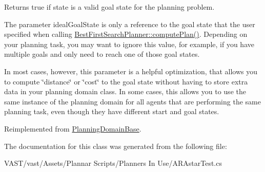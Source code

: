 Returns true if state is a valid goal state for the planning problem. 

The parameter ideal\-Goal\-State is only a reference to the goal state that the user specified when calling \hyperlink{class_best_first_search_planner_a777fb06939a33b3f3effb24b0dbda076}{Best\-First\-Search\-Planner\-::compute\-Plan()}. Depending on your planning task, you may want to ignore this value, for example, if you have multiple goals and only need to reach one of those goal states.

In most cases, however, this parameter is a helpful optimization, that allows you to compute \char`\"{}distance\char`\"{} or \char`\"{}cost\char`\"{} to the goal state without having to store extra data in your planning domain class. In some cases, this allows you to use the same instance of the planning domain for all agents that are performing the same planning task, even though they have different start and goal states. 

Reimplemented from \hyperlink{class_planning_domain_base_a56907006c1e4a4071f58da65705792d1}{Planning\-Domain\-Base}.



The documentation for this class was generated from the following file\-:\begin{DoxyCompactItemize}
\item 
V\-A\-S\-T/vast/\-Assets/\-Plannar Scripts/\-Planners In Use/A\-R\-Astar\-Test.\-cs\end{DoxyCompactItemize}
